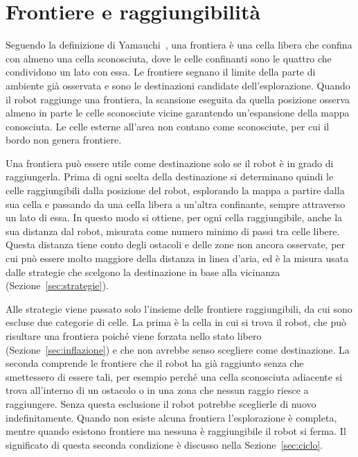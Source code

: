 \section{Frontiere e raggiungibilità}
\label{sec:frontiere}

Seguendo la definizione di Yamauchi~\cite{yamauchi1997}, una frontiera è una cella libera che confina con almeno una cella sconosciuta, dove le celle confinanti sono le quattro che condividono un lato con essa. Le frontiere segnano il limite della parte di ambiente già osservata e sono le destinazioni candidate dell'esplorazione. Quando il robot raggiunge una frontiera, la scansione eseguita da quella posizione osserva almeno in parte le celle sconosciute vicine garantendo un'espansione della mappa conosciuta. Le celle esterne all'area non contano come sconosciute, per cui il bordo non genera frontiere.

Una frontiera può essere utile come destinazione solo se il robot è in grado di raggiungerla. Prima di ogni scelta della destinazione si determinano quindi le celle raggiungibili dalla posizione del robot, esplorando la mappa a partire dalla sua cella e passando da una cella libera a un'altra confinante, sempre attraverso un lato di essa. In questo modo si ottiene, per ogni cella raggiungibile, anche la sua distanza dal robot, misurata come numero minimo di passi tra celle libere. Questa distanza tiene conto degli ostacoli e delle zone non ancora osservate, per cui può essere molto maggiore della distanza in linea d'aria, ed è la misura usata dalle strategie che scelgono la destinazione in base alla vicinanza (Sezione~\ref{sec:strategie}).

Alle strategie viene passato solo l'insieme delle frontiere raggiungibili, da cui sono escluse due categorie di celle. La prima è la cella in cui si trova il robot, che può risultare una frontiera poiché viene forzata nello stato libero (Sezione~\ref{sec:inflazione}) e che non avrebbe senso scegliere come destinazione. La seconda comprende le frontiere che il robot ha già raggiunto senza che smettessero di essere tali, per esempio perché una cella sconosciuta adiacente si trova all'interno di un ostacolo o in una zona che nessun raggio riesce a raggiungere. Senza questa esclusione il robot potrebbe sceglierle di nuovo indefinitamente. Quando non esiste alcuna frontiera l'esplorazione è completa, mentre quando esistono frontiere ma nessuna è raggiungibile il robot si ferma. Il significato di questa seconda condizione è discusso nella Sezione~\ref{sec:ciclo}.

